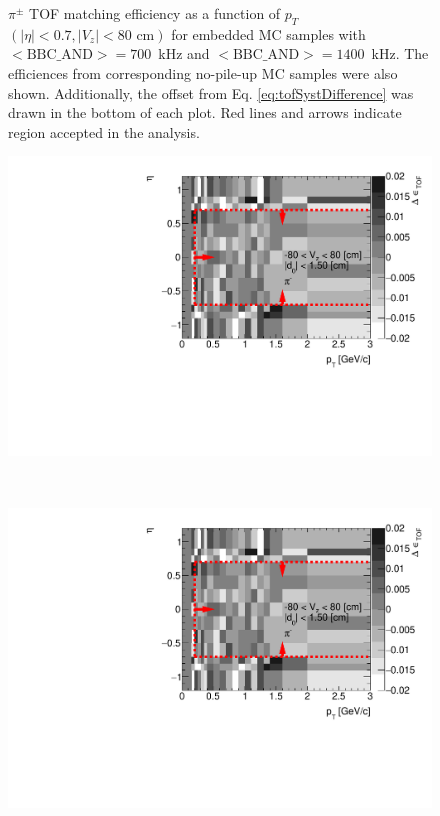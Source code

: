 \begin{figure}[hb]
{	}%
	\caption[$\pi^\pm$ TOF matching efficiency as a function of $p_T$ $\left(|\eta|<0.7, |V_z|<80\text{ cm}\right)$ for embedded MC samples with \mbox{$<\text{BBC\_AND}>=700$~kHz} and \mbox{$<\text{BBC\_AND}>=1400$~kHz}]{$\pi^\pm$ TOF matching efficiency as a function of $p_T$ $\left(|\eta|<0.7, |V_z|<80\text{ cm}\right)$ for embedded MC samples with \mbox{$<\text{BBC\_AND}>=700$~kHz} and \mbox{$<\text{BBC\_AND}>=1400$~kHz}. The efficiences from corresponding no-pile-up MC samples were also shown. Additionally, the offset  from Eq. \ref{eq:tofSystDifference} was drawn in the bottom of each plot. Red lines and arrows indicate region accepted in the analysis.}
	\label{fig:systError1Dtof}
\end{figure}
\begin{figure}[H]
	\centering
	\parbox{0.495\textwidth}{
		\centering
		\includegraphics[width=\linewidth,page=1]{graphics/systematicsEfficiency/bbc_and/tofEffi_d0_1_5_etapt_12D.pdf}\\
	}~
	\parbox{0.495\textwidth}{
		\centering
		\includegraphics[width=\linewidth,page=2]{graphics/systematicsEfficiency/bbc_and/tofEffi_d0_1_5_etapt_12D.pdf}\\
}
\end{figure}
